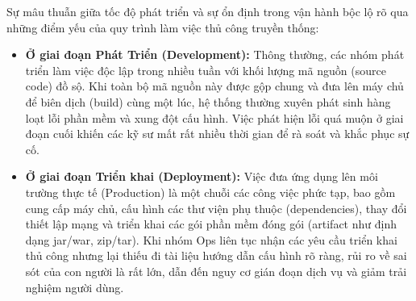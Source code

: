 \documentclass[12pt,a4paper,oneside]{extreport}
\begin{document}
Sự mâu thuẫn giữa tốc độ phát triển và sự ổn định trong vận hành bộc lộ rõ qua
những điểm yếu của quy trình làm việc thủ công truyền thống:
\begin{itemize}
  \item \textbf{Ở giai đoạn Phát Triển (Development):} Thông thường, các nhóm
  phát triển làm việc độc lập trong nhiều tuần với khối lượng mã nguồn (source
  code) đồ sộ. Khi toàn bộ mã nguồn này được gộp chung và đưa lên máy chủ để
  biên dịch (build) cùng một lúc, hệ thống thường xuyên phát sinh hàng loạt lỗi
  phần mềm và xung đột cấu hình. Việc phát hiện lỗi quá muộn ở giai đoạn cuối
  khiến các kỹ sư mất rất nhiều thời gian để rà soát và khắc phục sự cố.
  \item \textbf{Ở giai đoạn Triển khai (Deployment):} Việc đưa ứng dụng lên môi
  trường thực tế (Production) là một chuỗi các công việc phức tạp, bao gồm cung
  cấp máy chủ, cấu hình các thư viện phụ thuộc (dependencies), thay đổi thiết
  lập mạng và triển khai các gói phần mềm đóng gói (artifact như định dạng
  jar/war, zip/tar). Khi nhóm Ops liên tục nhận các yêu cầu triển khai thủ công
  nhưng lại thiếu đi tài liệu hướng dẫn cấu hình rõ ràng, rủi ro về sai sót của
  con người là rất lớn, dẫn đến nguy cơ gián đoạn dịch vụ và giảm trải nghiệm
  người dùng.
\end{itemize}
\end{document}
